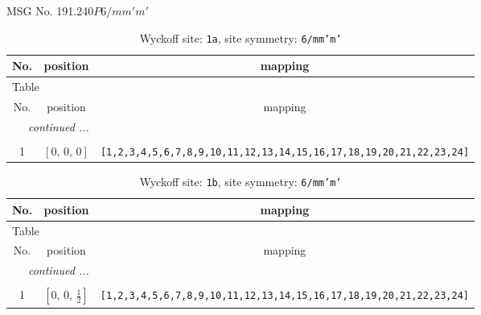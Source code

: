 \documentclass[fleqn,8pt]{jsarticle}
\begin{document}
\setcounter{MaxMatrixCols}{32}

\renewcommand{\tablename}{Table~}
\renewcommand{\figurename}{Figure~}
\begin{center}
\LARGE
MSG No. 191.240\quad$P6/mm'm'$
\end{center}
\renewcommand{\arraystretch}{1.2}
\begin{longtable}{ccc}
\caption{Wyckoff site: {\tt 1a}, site symmetry: {\tt 6/mm'm'}}
 \\
 \hline \hline
No. & position & mapping \\ \hline \endfirsthead

\multicolumn{2}{l}{\tablename\ \thetable{}} \\
 \hline \hline
No. & position & mapping \\ \hline \endhead

 \hline \hline
\multicolumn{2}{r}{\footnotesize\it continued ...} \\ \endfoot

 \hline \hline
\multicolumn{2}{r}{} \\ \endlastfoot

1 & $\left[ 0,\, 0,\, 0 \right]$ & {\tt [1,2,3,4,5,6,7,8,9,10,11,12,13,14,15,16,17,18,19,20,21,22,23,24]} \\
\end{longtable}
\renewcommand{\arraystretch}{1.2}
\begin{longtable}{ccc}
\caption{Wyckoff site: {\tt 1b}, site symmetry: {\tt 6/mm'm'}}
 \\
 \hline \hline
No. & position & mapping \\ \hline \endfirsthead

\multicolumn{2}{l}{\tablename\ \thetable{}} \\
 \hline \hline
No. & position & mapping \\ \hline \endhead

 \hline \hline
\multicolumn{2}{r}{\footnotesize\it continued ...} \\ \endfoot

 \hline \hline
\multicolumn{2}{r}{} \\ \endlastfoot

1 & $\left[ 0,\, 0,\, \frac{1}{2} \right]$ & {\tt [1,2,3,4,5,6,7,8,9,10,11,12,13,14,15,16,17,18,19,20,21,22,23,24]} \\
\end{longtable}
\renewcommand{\arraystretch}{1.2}
\end{document}
